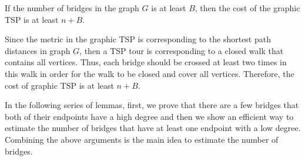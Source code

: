 \begin{claim}\label{lem:brdige-lower-bound}
If the number of bridges in the graph $G$ is at least $B$, then the cost of the graphic TSP is at least $n + B$.
\end{claim}
\begin{myproof}
Since the metric in the graphic TSP is corresponding to the shortest path distances in graph $G$, then a TSP tour is corresponding to a closed walk that contains all vertices. Thus, each bridge should be crossed at least two times in this walk in order for the walk to be closed and cover all vertices. Therefore, the cost of graphic TSP is at least $n + B$.
\end{myproof}


In the following series of lemmas, first, we prove that there are a few bridges that both of their endpoints have a high degree and then we show an efficient way to estimate the number of bridges that have at least one endpoint with a low degree. Combining the above arguments is the main idea to estimate the number of bridges.


